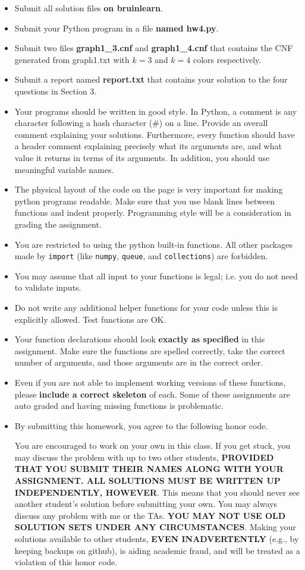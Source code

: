 \documentclass[10pt]{article}
\begin{document}
\begin{itemize}
  \item Submit all solution files \textbf{on bruinlearn}.
  \item Submit your Python program in a file \textbf{named hw4.py}.
  \item Submit two files \textbf{graph1\_3.cnf} and \textbf{graph1\_4.cnf} that contains the CNF generated from graph1.txt with $k=3$ and $k=4$ colors respectively.
  \item Submit a report named \textbf{report.txt} that contains your solution to the four questions in Section 3.
  \item Your programs should be written in good style. In Python, a comment is any character following a hash character (\#) on a line. Provide an overall comment explaining your solutions. Furthermore, every function should have a header comment explaining precisely what its arguments are, and what value it returns in terms of its arguments. In addition, you should use meaningful variable names.
  \item The physical layout of the code on the page is very important for making python programs readable. Make sure that you use blank lines between functions and indent properly. Programming style will be a consideration in grading the assignment.
  \item You are restricted to using the python built-in functions. All other packages made by \verb|import| (like \verb|numpy|, \verb|queue|, and \verb|collections|) are forbidden.
  \item You may assume that all input to your functions is legal; i.e. you do not need to
validate inputs.
  \item Do not write any additional helper functions for your code unless this is explicitly
allowed. Test functions are OK.
  \item Your function declarations should look \textbf{exactly as specified} in this assignment. Make
sure the functions are spelled correctly, take the correct number of arguments, and
those arguments are in the correct order.
  \item Even if you are not able to implement working versions of these functions, please \textbf{include a correct skeleton} of each. Some of these assignments are auto graded and having missing functions is problematic.
  \item By submitting this homework, you agree to the following honor code.
  
  You are encouraged to work on your own in this class. If you get stuck, you may discuss the problem with up to two other students, \textbf{PROVIDED THAT YOU SUBMIT THEIR NAMES ALONG WITH YOUR ASSIGNMENT. ALL SOLUTIONS MUST BE WRITTEN UP INDEPENDENTLY, HOWEVER}. This means that you should never see another student's solution before submitting your own. You may always discuss any problem with me or the TAs. \textbf{YOU MAY NOT USE OLD SOLUTION SETS UNDER ANY CIRCUMSTANCES}. Making your solutions available to other students, \textbf{EVEN INADVERTENTLY} (e.g., by keeping backups on github), is aiding academic fraud, and will be treated as a violation of this honor code.


\end{itemize}
\end{document}
